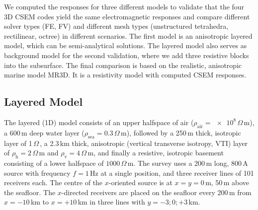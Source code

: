 \documentclass[extra, camera,%
]{gji}
\newcommand{\ohmm}{\ensuremath{\Omega\,}\text{m}\xspace}
\begin{document}
We computed the responses for three different models to validate that the four 3D CSEM codes yield the same electromagnetic responses and compare different solver types (FE, FV) and different mesh types (unstructured tetrahedra, rectilinear, octree) in different scenarios. The first model is an anisotropic\added{,} layered model, which can be  semi-analytical solutions. The layered model also serves as background model for the second validation, where we add three resistive blocks into the subsurface. The final comparison is based on the realistic, anisotropic marine model MR3D. It is a resistivity model  with computed CSEM responses.

\subsection{Layered Model}

The layered (1D) model consists of an upper halfspace of air ($\rho_\text{air}=\num{e8}\,\ohmm$), a 600\,m deep water layer ($\rho_\text{sea}=0.3\,\ohmm$), followed by a 250\,m thick, isotropic layer of 1\,\ohmm, a 2.3\,km thick, anisotropic (vertical transverse isotropy, VTI) layer of $\rho_\text{h}=2\,\ohmm$ and $\rho_\text{v}=4\,\ohmm$, and finally a resistive, isotropic basement consisting of a lower halfspace of $1000\,\ohmm$. The survey uses a 200\,m long, 800\,A source  with frequency $f=1\,$Hz at a single position, and three receiver lines of 101 receivers each. The centre of the $x$-oriented source is at $x=y=0\,$m, 50\,m above the seafloor. The $x$-directed receivers are placed on the seafloor every 200\,m from $x=-10\,$km to $x=+10\,$km in three lines with $y=-3; 0; +3\,$km.
\end{document}
